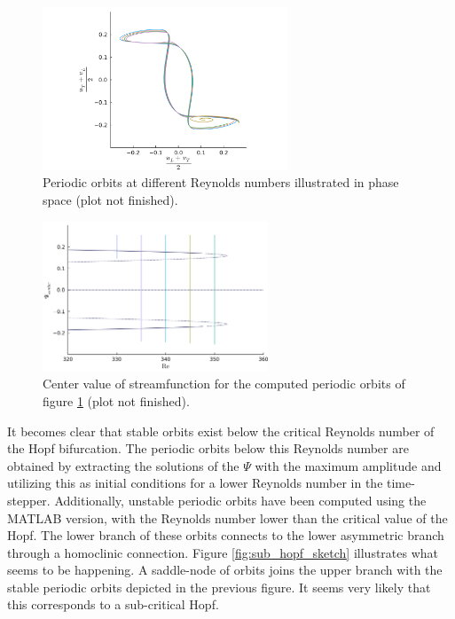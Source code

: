 \begin{figure}[ht]
  \centering
  \includegraphics[width=0.65\textwidth]{figs/orbits32x32.png}
  \caption{Periodic orbits at different Reynolds numbers illustrated in phase space (plot not finished).} 
  \label{fig:orbit}
\end{figure}

\begin{figure}[ht]
  \centering
  \includegraphics[width=0.6\textwidth]{figs/orbits_bif_diag32x32.png}
  \caption{Center value of streamfunction for the computed periodic orbits of figure \ref{fig:orbit}
  (plot not finished).} 
  \label{fig:orbit_bif_diag}
\end{figure}

It becomes clear that stable orbits exist below the critical Reynolds number of
the Hopf bifurcation. The periodic orbits below this Reynolds number are
obtained by extracting the solutions of the $\Psi$ with the maximum amplitude
and utilizing this as initial conditions for a lower Reynolds number in the
time-stepper. Additionally, unstable periodic orbits have been computed using
the MATLAB version, with the Reynolds number lower than the critical value of
the Hopf. The lower branch of these orbits connects to the lower asymmetric
branch through a homoclinic connection. Figure \ref{fig:sub_hopf_sketch}
illustrates what seems to be happening. A saddle-node of orbits joins the upper
branch with the stable periodic orbits depicted in the previous figure. It
seems very likely that this corresponds to a sub-critical Hopf.


